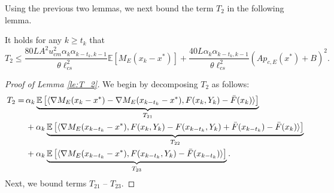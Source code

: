 \documentclass[11 pt]{article}
\begin{document}
	
	Using the previous two lemmas, we next bound the term $T_2$ in the following lemma.
	\begin{lemma}\label{le:T_2}
		It holds for any $k\geq t_k$ that $$T_2\leq \frac{80LA^2u_{cm}^2\alpha_k\alpha_{k-t_k,k-1}}{\theta\ell_{cs}^2}\mathbb{E}\left[M_E(x_k-x^*)\right]+\frac{40L\alpha_k\alpha_{k-t_k,k-1}}{\theta\ell_{cs}^2}\left(Ap_{c,E}(x^*)+B\right)^2.$$
	\end{lemma}
	\begin{proof}[Proof of Lemma \ref{le:T_2}]
		We begin by decomposing $T_2$ as follows:
		\begin{align}\label{eq:error decomposition T_2}
			T_2  =\,& \alpha_k\underbrace{\mathbb{E}\left[\langle\nabla M_E(x_k-x^*) - \nabla M_E(x_{k-t_k}-x^*),F(x_k,Y_k)-\Bar{F}(x_k)\rangle\right]}_{T_{21}}\nonumber\\
			&+ \alpha_k \underbrace{\mathbb{E}\left[\langle\nabla M_E(x_{k-t_k}-x^*),F(x_k,Y_k)-F(x_{k-t_k}, Y_k)+\Bar{F}(x_{k-t_k})-\Bar{F}(x_{k})\rangle\right]}_{T_{22}}\nonumber\\
			&+ \alpha_k\underbrace{\mathbb{E}\left[\langle\nabla M_E(x_{k-t_k}-x^*),F(x_{k-t_k},Y_k)-\Bar{F}(x_{k-t_k})\rangle\right]}_{T_{23}}.
		\end{align}
		Next, we bound terms $T_{21}$ -- $T_{23}$.
		
		
		

\end{proof}
\end{document}
